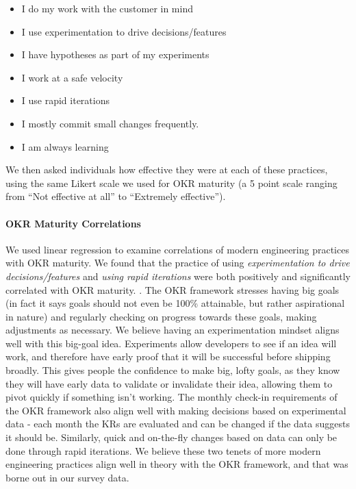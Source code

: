 \documentclass[sigconf, nonacm]{acmart}
\begin{document}
\begin{itemize}
\item I do my work with the customer in mind
\item I use experimentation to drive decisions/features
\item I have hypotheses as part of my experiments
\item I work at a safe velocity 
\item I use rapid iterations
\item I mostly commit small changes frequently.
\item I am always learning
\end{itemize}

We then asked individuals how effective they were at each of these practices, using the same Likert scale we used for OKR maturity (a 5 point scale ranging from ``Not effective at all'' to ``Extremely effective'').

\paragraph{OKR Maturity Correlations}
We used linear regression to examine correlations of modern engineering practices with OKR maturity. We found that the practice of using \emph{experimentation to drive decisions/features} and \emph{using rapid iterations} were both positively and significantly correlated with OKR maturity. . The OKR framework stresses having big goals (in fact it says goals should not even be 100\% attainable, but rather aspirational in nature) and regularly checking on progress towards these goals, making adjustments as necessary. We believe having an experimentation mindset aligns well with this big-goal idea. Experiments allow developers to see if an idea will work, and therefore have early proof that it will be successful before shipping broadly. This gives people the confidence to make big, lofty goals, as they know they will have early data to validate or invalidate their idea, allowing them to pivot quickly if something isn't working. The monthly check-in requirements of the OKR framework also align well with making decisions based on experimental data - each month the KRs are evaluated and can be changed if the data suggests it should be. Similarly, quick and on-the-fly changes based on data can only be done through rapid iterations. We believe these two tenets of more modern engineering practices align well in theory with the OKR framework, and that was borne out in our survey data. 
\end{document}
